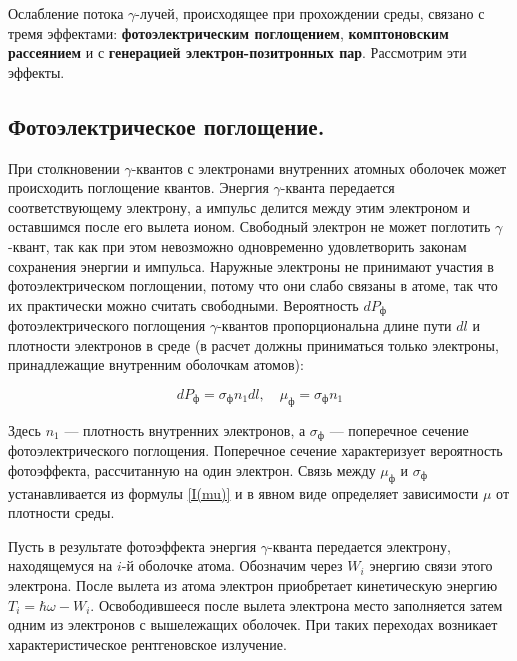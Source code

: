 \documentclass[a4paper, 12pt]{article}%
\begin{document}
	Ослабление потока $\gamma$-лучей, происходящее при прохождении среды, связано с тремя эффектами: \textbf{фотоэлектрическим поглощением},
	\textbf{комптоновским рассеянием} и с \textbf{генерацией электрон-позитронных пар}. Рассмотрим эти эффекты.
	
	\subsection{Фотоэлектрическое поглощение.} При столкновении $\gamma$-квантов с
	электронами внутренних атомных оболочек может происходить поглощение квантов. Энергия $\gamma$-кванта передается соответствующему электрону, а импульс делится между этим электроном и оставшимся после
	его вылета ионом. Свободный электрон не может поглотить $\gamma$-квант,
	так как при этом невозможно одновременно удовлетворить законам
	сохранения энергии и импульса. Наружные электроны не принимают участия в фотоэлектрическом поглощении, потому что они слабо
	связаны в атоме, так что их практически можно считать свободными.
	Вероятность $ dP_{\text{ф}} $ фотоэлектрического поглощения $\gamma$-квантов пропорциональна длине пути $ dl $ и плотности электронов в среде (в расчет
	должны приниматься только электроны, принадлежащие внутренним
	оболочкам атомов):
	
	\begin{equation}\label{mu ph}
	dP_{\text{ф}} = \sigma_{\text{ф}} n_1 dl, \quad \mu_{\text{ф}}= \sigma_{\text{ф}} n_1
	\end{equation}
	
	Здесь $ n_1 $ --- плотность внутренних электронов, а $ \sigma_{\text{ф}} $ --- поперечное сечение фотоэлектрического поглощения. Поперечное сечение характеризует вероятность фотоэффекта, рассчитанную на один электрон. Связь между $ \mu_{\text{ф}} $ и $ \sigma_{\text{ф}} $ устанавливается из формулы \eqref{I(mu)} и в явном виде определяет зависимости $ \mu $ от плотности среды.
	
	Пусть в результате фотоэффекта энергия $\gamma$-кванта передается
	электрону, находящемуся на $ i $-й оболочке атома. Обозначим через $ W_i $
	энергию связи этого электрона. После вылета из атома электрон приобретает кинетическую энергию $ T_i = \hbar \omega - W_i $.
	Освободившееся после вылета электрона место заполняется затем
	одним из электронов с вышележащих оболочек. При таких переходах
	возникает характеристическое рентгеновское излучение.
	
\end{document}
